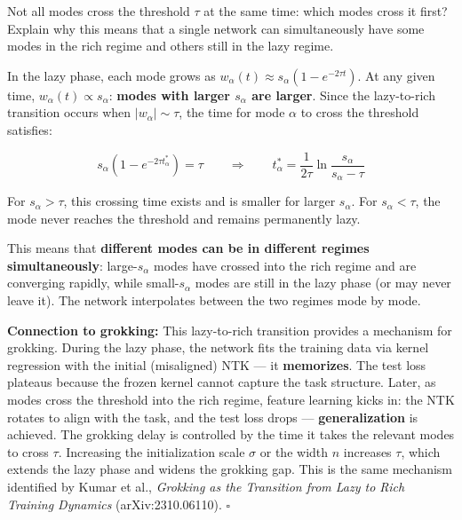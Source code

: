 \documentclass[11pt]{article}
\begin{document}
\begin{exercise}
\label{ex:td-5c}
Not all modes cross the
threshold \(\tau\) at the same time: which modes cross it first? Explain
why this means that a single network can simultaneously have some modes
in the rich regime and others still in the lazy regime.
\end{exercise}

\begin{solution}[ex:td-5c]
In the lazy phase, each mode grows as
\(w_\alpha(t) \approx s_\alpha(1 - e^{-2\tau t})\). At any given time,
\(w_\alpha(t) \propto s_\alpha\): \textbf{modes with larger \(s_\alpha\)
are larger}. Since the lazy-to-rich transition occurs when
\(|w_\alpha| \sim \tau\), the time for mode \(\alpha\) to cross the
threshold satisfies:

\[s_\alpha(1 - e^{-2\tau t_\alpha^*}) = \tau \qquad \Longrightarrow \qquad t_\alpha^* = \frac{1}{2\tau}\ln\frac{s_\alpha}{s_\alpha - \tau}\]

For \(s_\alpha > \tau\), this crossing time exists and is smaller for
larger \(s_\alpha\). For \(s_\alpha < \tau\), the mode never reaches the
threshold and remains permanently lazy.

This means that \textbf{different modes can be in different regimes
simultaneously}: large-\(s_\alpha\) modes have crossed into the rich
regime and are converging rapidly, while small-\(s_\alpha\) modes are
still in the lazy phase (or may never leave it). The network
interpolates between the two regimes mode by mode.

\textbf{Connection to grokking:} This lazy-to-rich transition provides a
mechanism for grokking. During the lazy phase, the network fits the
training data via kernel regression with the initial (misaligned) NTK
--- it \textbf{memorizes}. The test loss plateaus because the frozen
kernel cannot capture the task structure. Later, as modes cross the
threshold into the rich regime, feature learning kicks in: the NTK
rotates to align with the task, and the test loss drops ---
\textbf{generalization} is achieved. The grokking delay is controlled by
the time it takes the relevant modes to cross \(\tau\). Increasing the
initialization scale \(\sigma\) or the width \(n\) increases \(\tau\),
which extends the lazy phase and widens the grokking gap. This is the
same mechanism identified by Kumar et al., \emph{Grokking as the
Transition from Lazy to Rich Training Dynamics} (arXiv:2310.06110).
\(\square\)
\end{solution}
\end{document}
